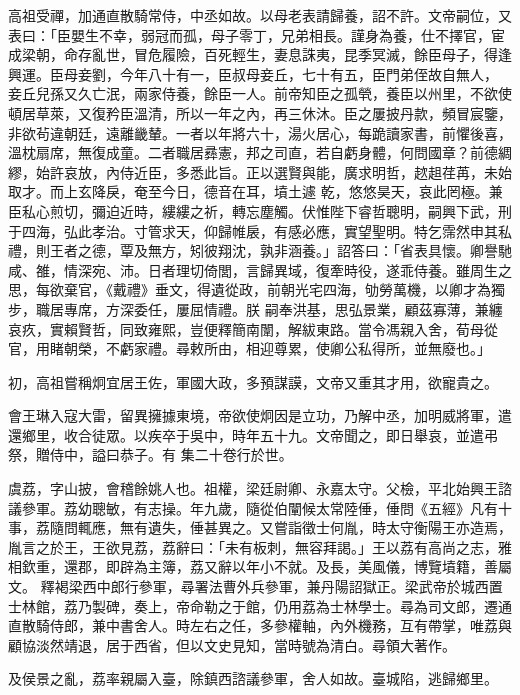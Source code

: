 \begin{pinyinscope}
 高祖受禪，加通直散騎常侍，中丞如故。以母老表請歸養，詔不許。文帝嗣位，又表曰：「臣嬰生不幸，弱冠而孤，母子零丁，兄弟相長。謹身為養，仕不擇官，宦成梁朝，命存亂世，冒危履險，百死輕生，妻息誅夷，昆季冥滅，餘臣母子，得逢興運。臣母妾劉，今年八十有一，臣叔母妾丘，七十有五，臣門弟侄故自無人，
 妾丘兒孫又久亡泯，兩家侍養，餘臣一人。前帝知臣之孤煢，養臣以州里，不欲使頓居草萊，又復矜臣溫清，所以一年之內，再三休沐。臣之屢披丹款，頻冒宸鑒，非欲茍違朝廷，遠離畿輦。一者以年將六十，湯火居心，每跪讀家書，前懼後喜，溫枕扇席，無復成童。二者職居彞憲，邦之司直，若自虧身體，何問國章？前德綢繆，始許哀放，內侍近臣，多悉此旨。正以選賢與能，廣求明哲，趑趄荏苒，未始取才。而上玄降戾，奄至今日，德音在耳，墳土遽
 乾，悠悠昊天，哀此罔極。兼臣私心煎切，彌迫近時，縷縷之祈，轉忘塵觸。伏惟陛下睿哲聰明，嗣興下武，刑于四海，弘此孝治。寸管求天，仰歸帷扆，有感必應，實望聖明。特乞霈然申其私禮，則王者之德，覃及無方，矧彼翔沈，孰非涵養。」詔答曰：「省表具懷。卿譽馳咸、雒，情深宛、沛。日者理切倚閭，言歸異域，復牽時役，遂乖侍養。雖周生之思，每欲棄官，《戴禮》垂文，得遺從政，前朝光宅四海，劬勞萬機，以卿才為獨步，職居專席，方深委任，屢屈情禮。朕
 嗣奉洪基，思弘景業，顧茲寡薄，兼纏哀疚，實賴賢哲，同致雍熙，豈便釋簡南闈，解紱東路。當令馮親入舍，荀母從官，用睹朝榮，不虧家禮。尋敕所由，相迎尊累，使卿公私得所，並無廢也。」



 初，高祖嘗稱炯宜居王佐，軍國大政，多預謀謨，文帝又重其才用，欲寵貴之。



 會王琳入寇大雷，留異擁據東境，帝欲使炯因是立功，乃解中丞，加明威將軍，遣還鄉里，收合徒眾。以疾卒于吳中，時年五十九。文帝聞之，即日舉哀，並遣弔祭，贈侍中，謚曰恭子。有
 集二十卷行於世。



 虞荔，字山披，會稽餘姚人也。祖權，梁廷尉卿、永嘉太守。父檢，平北始興王諮議參軍。荔幼聰敏，有志操。年九歲，隨從伯闡候太常陸倕，倕問《五經》凡有十事，荔隨問輒應，無有遺失，倕甚異之。又嘗詣徵士何胤，時太守衡陽王亦造焉，胤言之於王，王欲見荔，荔辭曰：「未有板刺，無容拜謁。」王以荔有高尚之志，雅相欽重，還郡，即辟為主簿，荔又辭以年小不就。及長，美風儀，博覽墳籍，善屬文。
 釋褐梁西中郎行參軍，尋署法曹外兵參軍，兼丹陽詔獄正。梁武帝於城西置士林館，荔乃製碑，奏上，帝命勒之于館，仍用荔為士林學士。尋為司文郎，遷通直散騎侍郎，兼中書舍人。時左右之任，多參權軸，內外機務，互有帶掌，唯荔與顧協淡然靖退，居于西省，但以文史見知，當時號為清白。尋領大著作。



 及侯景之亂，荔率親屬入臺，除鎮西諮議參軍，舍人如故。臺城陷，逃歸鄉里。




\end{pinyinscope}
